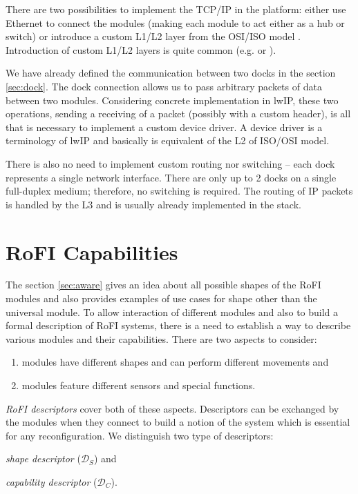 There are two possibilities to implement the TCP/IP in the platform: either use
Ethernet to connect the modules (making each module to act either as a hub or
switch) or introduce a custom L1/L2 layer from the OSI/ISO model
\cite{braden_requirements_1989}. Introduction of custom L1/L2 layers is quite
common (e.g. \cite{lindgren_ip_2008} or \cite{waitzman_ip_1999}).

We have already defined the communication between two docks in the section
\ref{sec:dock}. The dock connection allows us to pass arbitrary packets of data
between two modules. Considering concrete implementation in lwIP, these two
operations, sending a receiving of a packet (possibly with a custom header), is
all that is necessary to implement a custom device driver. A device driver is a
terminology of lwIP and basically is equivalent of the L2 of ISO/OSI model.

There is also no need to implement custom routing nor switching -- each dock
represents a single network interface. There are only up to 2 docks on a single
full-duplex medium; therefore, no switching is required. The routing of IP
packets is handled by the L3 and is usually already implemented in the stack.


\section{RoFI Capabilities}\label{sec:capabilities}

The section \ref{sec:aware} gives an idea about all possible shapes of the RoFI
modules and also provides examples of use cases for shape other than the
universal module. To allow interaction of different modules and also to build
a formal description of RoFI systems, there is a need to establish a way to
describe various modules and their capabilities. There are two aspects to
consider:
\begin{enumerate}
    \item modules have different shapes and can perform different movements and
    \item modules feature different sensors and special functions.
\end{enumerate}

\emph{RoFI descriptors} cover both of these aspects. Descriptors can be
exchanged by the modules when they connect to build a notion of the system which
is essential for any reconfiguration. We distinguish two type of descriptors:
\begin{enumerate*}
    \item \emph{shape descriptor} ($\mathcal{D}_S$) and
    \item \emph{capability descriptor} ($\mathcal{D}_C$).
\end{enumerate*}

